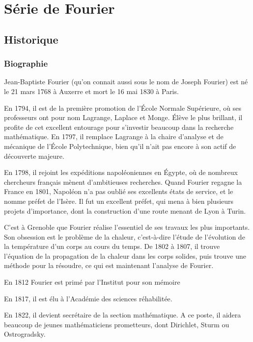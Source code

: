 \documentclass[a4paper,12pt]{report}
\begin{document}
\tableofcontents


\chapter{S\'erie de Fourier}
	\section{Historique}
		\subsection{Biographie}
Jean-Baptiste Fourier (qu'on connait aussi sous le nom de Joseph Fourier) est n\'e le 21 mars 1768 \`a Auxerre et mort le 16 mai 1830 \`a Paris. 

En 1794, il est de la premi\`ere promotion de l'\'Ecole Normale Sup\'erieure, o\`u ses professeurs ont pour nom Lagrange, Laplace et Monge. \'El\`eve le plus brillant, il profite de cet excellent entourage pour s'investir beaucoup dans la recherche math\'ematique. En 1797, il remplace Lagrange \`a la chaire d'analyse et de m\'ecanique de l'\'Ecole Polytechnique, bien qu'il n'ait pas encore \`a son actif de d\'ecouverte majeure.

En 1798, il rejoint les exp\'editions napol\'eoniennes en \'Egypte, o\`u de nombreux chercheurs fran\c cais m\`enent d'ambitieuses recherches. Quand Fourier regagne la France en 1801, Napol\'eon n'a pas oubli\'e ses excellents \'etats de service, et le nomme pr\'efet de l'Is\`ere. Il fut un excellent pr\'efet, qui mena \`a bien plusieurs projets d'importance, dont la construction d'une route menant de Lyon \`a Turin. 

C'est \`a Grenoble que Fourier r\'ealise l'essentiel de ses travaux les plus importants. Son obsession est le probl\`eme de la chaleur, c'est-\`a-dire l'\'etude de l'\'evolution de la temp\'erature d'un corps au cours du temps. De 1802 \`a 1807, il trouve l'\'equation de la propagation de la chaleur dans les corps solides, puis trouve une m\'ethode pour la r\'esoudre, ce qui est maintenant l'analyse de Fourier.

En 1812 Fourier est prim\'e par l'Institut pour son m\'emoire 

En 1817, il est \'elu \`a l'Acad\'emie des sciences r\'ehabilit\'ee. 

En 1822, il devient secr\'etaire de la section math\'ematique. A ce poste, il aidera beaucoup de jeunes math\'ematiciens prometteurs, dont Dirichlet, Sturm ou Ostrogradsky. \newpage
		
\end{document}
